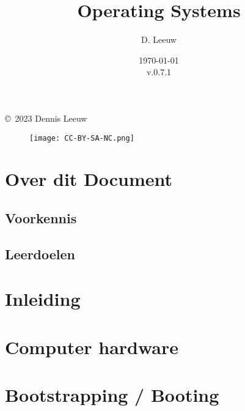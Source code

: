 \documentclass[a4paper,12pt,twoside,openright,titlepage]{book}
\author{D. Leeuw}
\title{Operating Systems}
\date{\today\\v.0.7.1}
\begin{document}

\maketitle

\copyright\ 2023 Dennis Leeuw\\

\begin{figure}
\texttt{[image: CC-BY-SA-NC.png]}
\end{figure}

\bigskip




\frontmatter
\chapter{Over dit Document}
\section{Voorkennis}

\section{Leerdoelen}


\tableofcontents


\mainmatter
\chapter{Inleiding}


\chapter{Computer hardware}


\chapter{Bootstrapping / Booting}

\end{document}
